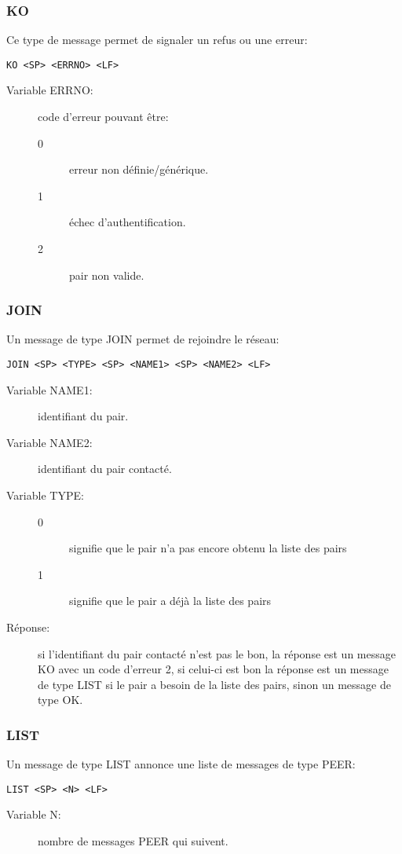 \subsubsection*{KO}
Ce type de message permet de signaler un refus ou une erreur:
\begin{verbatim}
KO <SP> <ERRNO> <LF>
\end{verbatim}
\begin{description}
\item[Variable ERRNO: ] code d'erreur pouvant être:
  \begin{description}
  \item[0] erreur non définie/générique.
  \item[1] échec d'authentification.
  \item[2] pair non valide.
  \end{description}
\end{description}

\subsubsection*{JOIN}
Un message de type JOIN permet de rejoindre le réseau:
\begin{verbatim}
JOIN <SP> <TYPE> <SP> <NAME1> <SP> <NAME2> <LF>
\end{verbatim}
\begin{description}
\item[Variable NAME1:] identifiant du pair.
\item[Variable NAME2:] identifiant du pair contacté.
\item[Variable TYPE:]
  \begin{description}
  \item[0] signifie que le pair n'a pas encore obtenu la liste des pairs
  \item[1] signifie que le pair a déjà la liste des pairs
  \end{description}
\item[Réponse:] si l'identifiant du pair contacté n'est pas le bon, la
  réponse est un message KO avec un code d'erreur 2, si celui-ci est bon la
  réponse est un message de type LIST si le pair a besoin de la liste des
  pairs, sinon un message de type OK.
\end{description}

\subsubsection*{LIST}
Un message de type LIST annonce une liste de messages de type PEER:
\begin{verbatim}
LIST <SP> <N> <LF>
\end{verbatim}
\begin{description}
\item[Variable N:] nombre de messages PEER qui suivent.
\end{description}

